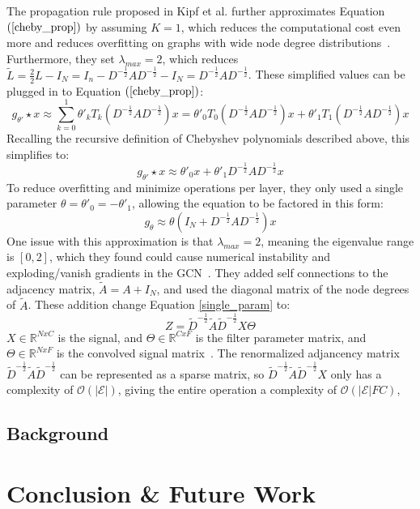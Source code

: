 \documentclass{article}
\begin{document}
The propagation rule proposed in Kipf et al. further approximates Equation 
$(\ref{cheby_prop})$ by assuming $K = 1$, which reduces the computational cost even more and reduces overfitting on graphs with wide node degree distributions~\cite{Kipf2016}. Furthermore, they set $\lambda_{max} = 2$, which reduces $\tilde{L} = \frac{2}{2}L - I_N = I_n - D^{-\frac{1}{2}}AD^{-\frac{1}{2}} - I_N = D^{-\frac{1}{2}}AD^{-\frac{1}{2}}$.  These simplified values can be plugged in to Equation $(\ref{cheby_prop})$:
\begin{equation}
\label{reduce_k}
g_{\theta'} \star x \approx \sum\limits_{k=0}^{1} \theta'_k T_k (D^{-\frac{1}{2}}AD^{-\frac{1}{2}})x = \theta'_0 T_0(D^{-\frac{1}{2}}AD^{-\frac{1}{2}})x + \theta'_1 T_1(D^{-\frac{1}{2}}AD^{-\frac{1}{2}})x 
\end{equation}
Recalling the recursive definition of Chebyshev polynomials described above, this simplifies to:
\begin{equation}
\label{simplified_1stcheby}
g_{\theta'} \star x \approx \theta'_0x + \theta'_1 D^{-\frac{1}{2}}AD^{-\frac{1}{2}}x 
\end{equation}
To reduce overfitting and minimize operations per layer, they only used a single parameter $\theta = \theta'_0 = -\theta'_1$, allowing the equation to be factored in this form:
\begin{equation}
\label{single_param}
g_\theta \approx \theta(I_N + D^{-\frac{1}{2}}AD^{-\frac{1}{2}})x
\end{equation}
One issue with this approximation is that $\lambda_{max} = 2$, meaning the eigenvalue range is $[0,2]$, which they found could cause numerical instability and exploding/vanish gradients in the GCN~\cite{Kipf2016}.  They added self connections to the adjacency matrix, $\tilde{A} = A + I_N$, and used the diagonal matrix of the node degrees of $\tilde{A}$.  These addition change Equation \ref{single_param} to:
\begin{equation}
\label{renormalized}
Z = \tilde{D}^{-\frac{1}{2}}\tilde{A}\tilde{D}^{-\frac{1}{2}}X\Theta
\end{equation}
$X \in \mathbb{R}^{N x C}$ is the signal, and $\Theta \in \mathbb{R}^{C x F}$ is the filter parameter matrix, and $\Theta \in \mathbb{R}^{N x F}$ is the convolved signal matrix~\cite{Kipf2016}. The renormalized adjancency matrix $\tilde{D}^{-\frac{1}{2}}\tilde{A}\tilde{D}^{-\frac{1}{2}}$ can be represented as a sparse matrix, so $\tilde{D}^{-\frac{1}{2}}\tilde{A}\tilde{D}^{-\frac{1}{2}}X$ only has a complexity of $\mathcal{O}(|\mathcal{E}|)$, giving the entire operation a complexity of $\mathcal{O}(|\mathcal{E}|FC)$,

\subsection{Background}


\section{Conclusion \& Future Work}



\end{document}
